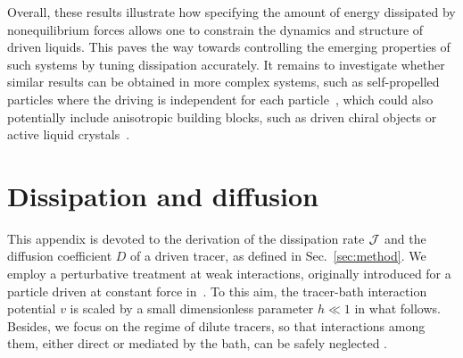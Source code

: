 \documentclass[superscriptaddress, twocolumn, prx, longbibliography, nofootinbib]{revtex4-1}
\begin{document}
Overall, these results illustrate how specifying the amount of energy dissipated by nonequilibrium forces allows one to constrain the dynamics and structure of driven liquids. This paves the way towards controlling the emerging properties of such systems by tuning dissipation accurately. It remains to investigate whether similar results can be obtained in more complex systems, such as self-propelled particles where the driving is independent for each particle~\cite{Marchetti2013, Cates2015, Bechinger2016, Marchetti2018}, which could also potentially include anisotropic building blocks, such as driven chiral objects or active liquid crystals~\cite{Joshi2017, VanZuiden2016, Nguyen2014b}. 








\appendix

\section{Dissipation and diffusion}\label{app:diff}

This appendix is devoted to the derivation of the dissipation rate $\cal J$ and the diffusion coefficient $D$ of a driven tracer, as defined in Sec.~\ref{sec:method}. We employ a perturbative treatment at weak interactions, originally introduced for a particle driven at constant force in~\cite{Demery2011, Demery2014}. To this aim, the tracer-bath interaction potential $v$ is scaled by a small dimensionless parameter $h\ll1$ in what follows. Besides, we focus on the regime of dilute tracers, so that interactions among them, either direct or mediated by the bath, can be safely neglected .
\end{document}
